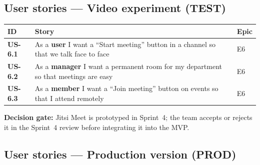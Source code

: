 \documentclass[12pt,a4paper]{report}
\begin{document}
\subsection{User stories — Video experiment (TEST)}

\begin{center}
\begin{tabular}{>{\bfseries}p{1.5cm} p{10cm} p{2.2cm}}
\toprule
\textbf{ID} & \textbf{Story} & \textbf{Epic} \\
\midrule
US-6.1 & As a \textbf{user} I want a ``Start meeting'' button in a channel so that we talk face to face & E6 \\
US-6.2 & As a \textbf{manager} I want a permanent room for my department so that meetings are easy & E6 \\
US-6.3 & As a \textbf{member} I want a ``Join meeting'' button on events so that I attend remotely & E6 \\
\bottomrule
\end{tabular}
\end{center}

\textbf{Decision gate:} Jitsi Meet is prototyped in Sprint~4; the team accepts or rejects
it in the Sprint~4 review before integrating it into the MVP.

\subsection{User stories — Production version (PROD)}
\end{document}
